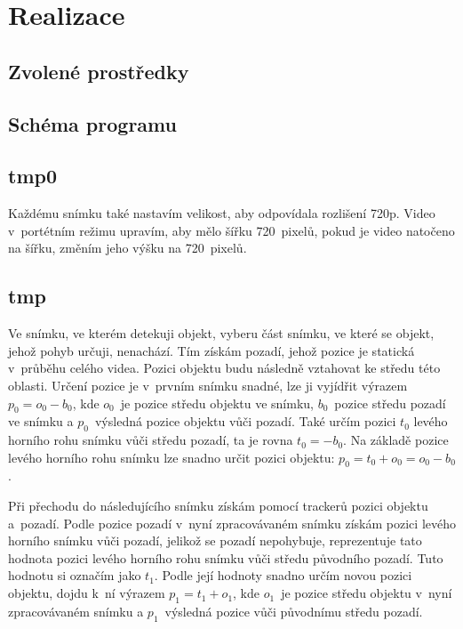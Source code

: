 \chapter{Realizace}
\label{chap:realizace}

\section{Zvolené prostředky}

\section{Schéma programu}



\section{tmp0}

Každému snímku také nastavím velikost, aby odpovídala rozlišení 720p. Video v~portétním režimu upravím, aby mělo šířku 720~pixelů, pokud je video natočeno na šířku, změním jeho výšku na 720~pixelů.

\section{tmp}

Ve snímku, ve kterém detekuji objekt, vyberu část snímku, ve které se objekt, jehož pohyb určuji, nenachází. Tím získám pozadí, jehož pozice je statická v~průběhu celého videa. Pozici objektu budu následně vztahovat ke středu této oblasti. Určení pozice je v~prvním snímku snadné, lze ji vyjídřit výrazem $p_0=o_0-b_0$, kde $o_0$~je pozice středu objektu ve snímku, $b_0$~pozice středu pozadí ve snímku a $p_0$~výsledná pozice objektu vůči pozadí. Také určím pozici $t_0$ levého horního rohu snímku vůči středu pozadí, ta je rovna $t_0=-b_0$. Na základě pozice levého horního rohu snímku lze snadno určit pozici objektu: $p_0=t_0+o_0=o_0-b_0$.

Při přechodu do následujícího snímku získám pomocí trackerů pozici objektu a~pozadí. Podle pozice pozadí v~nyní zpracovávaném snímku získám pozici levého horního snímku vůči pozadí, jelikož se pozadí nepohybuje, reprezentuje tato hodnota pozici levého horního rohu snímku vůči středu původního pozadí. Tuto hodnotu si označím jako $t_1$. Podle její hodnoty snadno určím novou pozici objektu, dojdu k~ní výrazem $p_1=t_1+o_1$, kde $o_1$~je pozice středu objektu v~nyní zpracovávaném snímku a $p_1$~výsledná pozice vůči původnímu středu pozadí.


